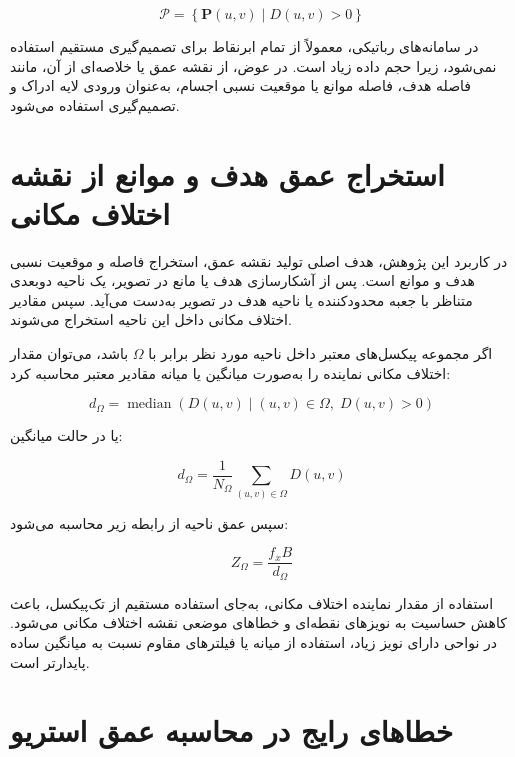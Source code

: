\begin{equation}
	\mathcal{P}
	=
	\left\{
	\mathbf{P}(u,v)
	\;|\;
	D(u,v)>0
	\right\}
\end{equation}

در سامانه‌های رباتیکی، معمولاً از تمام ابرنقاط برای تصمیم‌گیری مستقیم استفاده نمی‌شود، زیرا حجم داده زیاد است. در عوض، از نقشه عمق یا خلاصه‌ای از آن، مانند فاصله هدف، فاصله موانع یا موقعیت نسبی اجسام، به‌عنوان ورودی لایه ادراک و تصمیم‌گیری استفاده می‌شود.

\section{استخراج عمق هدف و موانع از نقشه اختلاف مکانی}

در کاربرد این پژوهش، هدف اصلی تولید نقشه عمق، استخراج فاصله و موقعیت نسبی هدف و موانع است. پس از آشکارسازی هدف یا مانع در تصویر، یک ناحیه دوبعدی متناظر با جعبه محدودکننده یا ناحیه هدف در تصویر به‌دست می‌آید. سپس مقادیر اختلاف مکانی داخل این ناحیه استخراج می‌شوند.

اگر مجموعه پیکسل‌های معتبر داخل ناحیه مورد نظر برابر با \(\Omega\) باشد، می‌توان مقدار اختلاف مکانی نماینده را به‌صورت میانگین یا میانه مقادیر معتبر محاسبه کرد:

\begin{equation}
	d_{\Omega}
	=
	\operatorname{median}
	\left(
	D(u,v)
	\;|\;
	(u,v)\in\Omega,\;
	D(u,v)>0
	\right)
	\label{eq:roi_disparity_median}
\end{equation}

یا در حالت میانگین:

\begin{equation}
	d_{\Omega}
	=
	\frac{1}{N_{\Omega}}
	\sum_{(u,v)\in\Omega}
	D(u,v)
	\label{eq:roi_disparity_mean}
\end{equation}

سپس عمق ناحیه از رابطه زیر محاسبه می‌شود:

\begin{equation}
	Z_{\Omega}
	=
	\frac{f_x B}{d_{\Omega}}
	\label{eq:roi_depth}
\end{equation}

استفاده از مقدار نماینده اختلاف مکانی، به‌جای استفاده مستقیم از تک‌پیکسل، باعث کاهش حساسیت به نویزهای نقطه‌ای و خطاهای موضعی نقشه اختلاف مکانی می‌شود. در نواحی دارای نویز زیاد، استفاده از میانه یا فیلترهای مقاوم نسبت به میانگین ساده پایدارتر است.

\section{خطاهای رایج در محاسبه عمق استریو}

